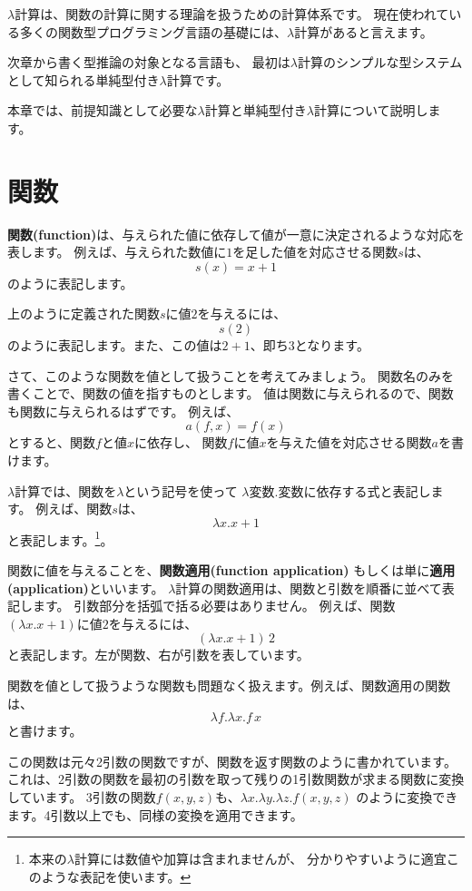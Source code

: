 
$\lambda$計算は、関数の計算に関する理論を扱うための計算体系です。
現在使われている多くの関数型プログラミング言語の基礎には、$\lambda$計算があると言えます。

次章から書く型推論の対象となる言語も、
最初は$\lambda$計算のシンプルな型システムとして知られる単純型付き$\lambda$計算です。

本章では、前提知識として必要な$\lambda$計算と単純型付き$\lambda$計算について説明します。

\section{関数}

\textbf{関数(function)}は、与えられた値に依存して値が一意に決定されるような対応を表します。
例えば、与えられた数値に$1$を足した値を対応させる関数$s$は、
\[
  s(x) = x+1
\]
のように表記します。

上のように定義された関数$s$に値$2$を与えるには、
\[
  s(2)
\]
のように表記します。また、この値は$2+1$、即ち$3$となります。

さて、このような関数を値として扱うことを考えてみましょう。
関数名のみを書くことで、関数の値を指すものとします。
値は関数に与えられるので、関数も関数に与えられるはずです。
例えば、
\[
  a(f, x) = f(x)
\]
とすると、関数$f$と値$x$に依存し、
関数$f$に値$x$を与えた値を対応させる関数$a$を書けます。

$\lambda$計算では、関数を$\lambda$という記号を使って
$\lambda \text{変数} . \text{変数に依存する式}$と表記します。
例えば、関数$s$は、
\[
  \lambda x . x + 1
\]
と表記します。\footnote{本来の$\lambda$計算には数値や加算は含まれませんが、
分かりやすいように適宜このような表記を使います。}。

関数に値を与えることを、\textbf{関数適用(function application)}
もしくは単に\textbf{適用(application)}といいます。
$\lambda$計算の関数適用は、関数と引数を順番に並べて表記します。
引数部分を括弧で括る必要はありません。
例えば、関数$(\lambda x . x + 1)$に値$2$を与えるには、
\[
  (\lambda x . x + 1) \, 2
\]
と表記します。左が関数、右が引数を表しています。

関数を値として扱うような関数も問題なく扱えます。例えば、関数適用の関数は、
\[
  \lambda f . \lambda x . f \, x
\]
と書けます。

この関数は元々2引数の関数ですが、関数を返す関数のように書かれています。
これは、2引数の関数を最初の引数を取って残りの1引数関数が求まる関数に変換しています。
3引数の関数$f(x, y, z)$も、$\lambda x . \lambda y . \lambda z . f(x, y, z)$
のように変換できます。4引数以上でも、同様の変換を適用できます。

